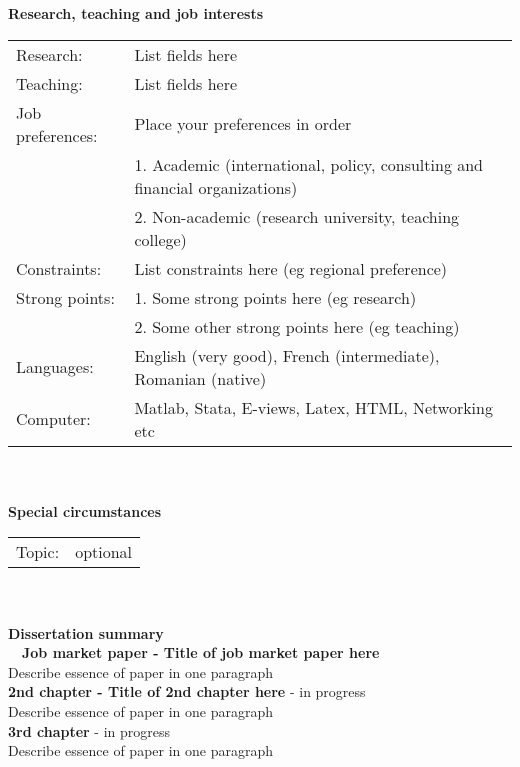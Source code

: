 \documentclass{econtex}
\begin{document}
\textbf{\large{Research, teaching and job interests}}\vspace{3mm} \\
\begin{tabular}{l p{5in}}
Research: & List fields here\vspace{1mm}\\
Teaching: & List fields here\vspace{1mm}\\
Job preferences: & Place your preferences in order\vspace{1mm}\\
& 1. Academic (international, policy, consulting and financial organizations)\vspace{1mm}\\
& 2. Non-academic (research university, teaching college)\vspace{1mm}\\
Constraints: & List constraints here (eg regional preference)\vspace{1mm}\\
Strong points: & 1. Some strong points here (eg research)\vspace{1mm}\\
& 2. Some other strong points here (eg teaching)\vspace{1mm}\\
Languages: & English (very good), French (intermediate),
Romanian (native)\vspace{1mm}\\
Computer: & Matlab, Stata, E-views, Latex, HTML,
Networking etc\vspace{1mm}\\
\end{tabular}
\\
\\
\textbf{\large{Special circumstances}}\vspace{3mm} \\
\begin{tabular}{l p{5in}}
Topic: & optional\vspace{1mm}\\
\end{tabular}
\\
\\
\textbf{\large{Dissertation summary}} \vspace{2mm}\\
\
\
\textbf{Job market paper - Title of job market paper here}\vspace{2mm}\\
Describe essence of paper in one paragraph\\

\textbf{2nd chapter - Title of 2nd chapter here} - in progress\vspace{2mm}\\
Describe essence of paper in one paragraph\\

\textbf{3rd chapter} - in progress\vspace{2mm}\\
Describe essence of paper in one paragraph\\
\end{document}
